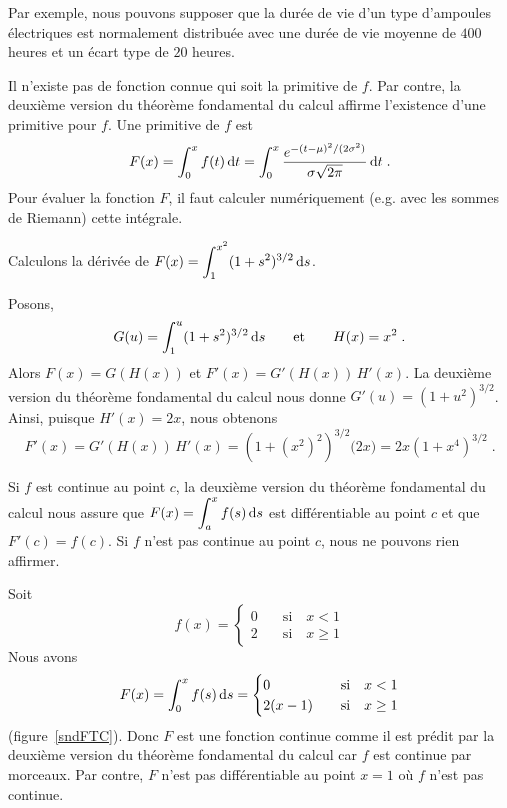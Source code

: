 {\begin{egg}
Par exemple, nous pouvons supposer que la durée de vie d'un type d'ampoules
électriques est normalement distribuée avec une durée de vie moyenne
de $400$ heures et un écart type de $20$ heures.

Il n'existe pas de fonction connue qui soit la primitive de $f$.  Par
contre, la deuxième version du théorème fondamental du calcul affirme
l'existence d'une primitive pour $f$.  Une primitive de $f$ est
\[
F(x) = \int_0^x f(t) \,\mathrm{d}t =
\int_0^x \frac{e^{-(t-\mu)^2/(2\sigma^2)}}{\sigma \sqrt{2\pi}} \,\mathrm{d}t \; .
\]
Pour évaluer la fonction $F$, il faut calculer numériquement
(e.g. avec les sommes de Riemann) cette intégrale. 
\end{egg}


\begin{egg}
Calculons la dérivée de
$\displaystyle F(x) = \int_1^{x^2} (1+s^2)^{3/2} \,\mathrm{d}s$.

Posons,
\[
G(u) = \int_1^u (1+s^2)^{3/2} \,\mathrm{d}s \qquad \text{et} \qquad
H(x) = x^2 \; .
\]
Alors $F(x) = G(H(x))$ et $F'(x) = G'(H(x))\,H'(x)$.  La deuxième
version du théorème fondamental du calcul nous donne
$G'(u) = (1+u^2)^{3/2}$.  Ainsi, puisque $H'(x) = 2x$, nous obtenons
\[
F'(x) = G'(H(x))\,H'(x) = \left(1+\left(x^2\right)^2\right)^{3/2}
\big( 2x\big) = 2x\left(1+x^4\right)^{3/2} \; .
\]
\end{egg}

\begin{rmk}
Si $f$ est continue au point $c$, la deuxième version du théorème
fondamental du calcul nous assure que
$\displaystyle F(x) = \int_a^x f(s) \,\mathrm{d}s$
est différentiable au point $c$ et que $F'(c) = f(c)$.  Si $f$ n'est
pas continue au point $c$, nous ne pouvons rien affirmer.

Soit
\[
f(x) = \begin{cases}
0 & \quad \text{si} \quad x<1 \\
2 & \quad \text{si} \quad x\geq 1
\end{cases}
\]
Nous avons
\[
F(x) = \int_0^x f(s)\,\mathrm{d}s = \begin{cases}
0 & \quad \text{si} \quad x < 1 \\
2(x-1) & \quad \text{si} \quad x \geq 1
\end{cases} 
\]
(figure~\ref{sndFTC}).  Donc $F$ est une fonction continue comme il
est prédit par la deuxième version du théorème fondamental du calcul
car $f$ est continue par morceaux.    Par contre, $F$ n'est pas
différentiable au point $x=1$ où $f$ n'est pas continue.
\end{rmk}

}
